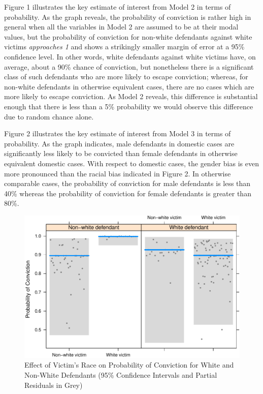 \documentclass[12pt,article]{article}
\begin{document}
\pagebreak

Figure 1 illustrates the key estimate of interest from Model 2 in terms
of probability. As the graph reveals, the probability of conviction is
rather high in general when all the variables in Model 2 are assumed to
be at their modal values, but the probability of conviction for
non-white defendants against white victims \emph{approaches 1} and shows
a strikingly smaller margin of error at a 95\% confidence level. In
other words, white defendants against white victims have, on average,
about a 90\% chance of conviction, but nonetheless there is a
significant class of such defendants who are more likely to escape
conviction; whereas, for non-white defendants in otherwise equivalent
cases, there are no cases which are more likely to escape conviction. As
Model 2 reveals, this difference is substantial enough that there is
less than a 5\% probability we would observe this difference due to
random chance alone.

Figure 2 illustrates the key estimate of interest from Model 3 in terms
of probability. As the graph indicates, male defendants in domestic
cases are significantly less likely to be convicted than female
defendants in otherwise equivalent domestic cases. With respect to
domestic cases, the gender bias is even more pronounced than the racial
bias indicated in Figure 2. In otherwise comparable cases, the
probability of conviction for male defendants is less than 40\% whereas
the probability of conviction for female defendants is greater than
80\%.

\begin{figure}[htbp]
\centering
\includegraphics{stand_your_ground_article_files/figure-latex/unnamed-chunk-4.pdf}
\caption{Effect of Victim's Race on Probability of Conviction for White
and Non-White Defendants (95\% Confidence Intervals and Partial
Residuals in Grey)}
\end{figure}
\end{document}
